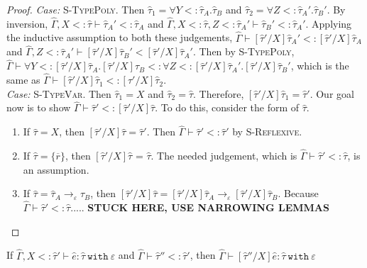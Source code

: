 \documentclass{llncs}
\newcommand{\keywadj}[1]{\mathtt{#1}}
\newcommand{\keyw}[1]{\keywadj{#1}~}
\newcommand{\kw}[1]{\keyw{ #1 }}
\begin{document}
\begin{proof}
\textit{Case:} \textsc{S-TypePoly}. Then $\hat \tau_1 = \forall Y <: \hat \tau_A. \hat \tau_B$ and $\hat \tau_2 = \forall Z <: \hat \tau_A'. \hat \tau_B'$. By inversion, $\hat \Gamma, X <: \hat \tau \vdash \hat \tau_A' <: \hat \tau_A$ and $\hat \Gamma, X <: \hat \tau, Z <: \hat \tau_A' \vdash \hat \tau_B' <: \hat \tau_A'$. Applying the inductive assumption to both these judgements, $\hat \Gamma \vdash [\hat \tau'/X]\hat \tau_A' <: [\hat \tau'/X]\hat \tau_A$ and $\hat \Gamma, Z <: \hat \tau_A' \vdash [\hat \tau'/X]\hat \tau_B' < [\hat \tau'/X]\hat \tau_A'$. Then by \textsc{S-TypePoly}, $\hat \Gamma \vdash \forall Y <: [\hat \tau'/X]\hat \tau_A. [\hat \tau'/X]\hat \tau_B <: \forall Z <: [\hat \tau'/X]\hat \tau_A'. [\hat \tau'/X]\hat \tau_B'$, which is the same as $\hat \Gamma \vdash [\hat \tau'/X]\hat \tau_1 <: [\hat \tau'/X]\hat \tau_2$.\\

\textit{Case:} \textsc{S-TypeVar}. Then $\hat \tau_1 = X$ and $\hat \tau_2 = \hat \tau$. Therefore, $[\hat \tau'/X]\hat \tau_1 = \hat \tau'$. Our goal now is to show $\hat \Gamma \vdash \hat \tau' <: [\hat \tau'/X]\hat \tau$. To do this, consider the form of $\hat \tau$.

\begin{enumerate}

	\item If $\hat \tau = X$, then $[\hat \tau'/X]\hat \tau = \hat \tau'$. Then $\hat \Gamma \vdash \hat \tau' <: \hat \tau'$ by \textsc{S-Reflexive}.

	\item If $\hat \tau = \{ \overline{r} \}$, then $[\hat \tau'/X]\hat \tau$ = $\hat \tau$. The needed judgement, which is $\hat \Gamma \vdash \hat \tau' <: \hat \tau$, is an assumption.

	\item If $\hat \tau = \hat \tau_A \rightarrow_{\varepsilon} \hat \tau_B$, then $[\hat \tau'/X]\hat \tau = [\hat \tau'/X]\hat \tau_A \rightarrow_{\varepsilon} [\hat \tau'/X]\hat \tau_B$. Because $\hat \Gamma \vdash \hat \tau' <: \hat \tau$..... \textbf{STUCK HERE, USE NARROWING LEMMAS}

\end{enumerate}


\end{proof}


\hrulefill

\begin{lemma}
If $\hat \Gamma, X <: \hat \tau' \vdash \hat e: \hat \tau~\kw{with} \varepsilon$ and $\hat \Gamma \vdash \hat \tau'' <: \hat \tau'$, then $\hat \Gamma \vdash [\hat \tau''/X]\hat e: \hat \tau~\kw{with} \varepsilon$
\end{lemma}
\end{document}
